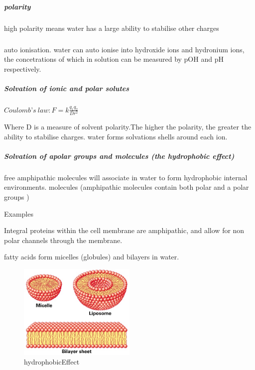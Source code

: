 \documentclass[]{article}
\let\oldsubparagraph\subparagraph
\renewcommand{\subparagraph}[1]{\oldsubparagraph{#1}\mbox{}}
\begin{document}
\hypertarget{polarity}{%
\subparagraph{polarity}\label{polarity}}

high polarity means water has a large ability to stabilise other charges

\hypertarget{section}{%
\subparagraph{}\label{section}}

auto ionisation. water can auto ionise into hydroxide ions and hydronium
ions, the concetrations of which in solution can be measured by pOH and
pH respectively.

\hypertarget{solvation-of-ionic-and-polar-solutes}{%
\subparagraph{Solvation of ionic and polar
solutes}\label{solvation-of-ionic-and-polar-solutes}}

\(Coulomb’s\ law: F = k\frac{ q_{1}q_{2}}{ Dr^{2}}\)

Where D is a measure of solvent polarity.The higher the polarity, the
greater the ability to stabilise charges. water forms solvations shells
around each ion.

\hypertarget{solvation-of-apolar-groups-and-molecules-the-hydrophobic-effect}{%
\subparagraph{Solvation of apolar groups and molecules (the hydrophobic
effect)}\label{solvation-of-apolar-groups-and-molecules-the-hydrophobic-effect}}

free amphipathic molecules will associate in water to form hydrophobic
internal environments. molecules (amphipathic molecules contain both
polar and a polar groups )

Examples

Integral proteins within the cell membrane are amphipathic, and allow
for non polar channels through the membrane.

fatty acids form micelles (globules) and bilayers in water.

\begin{figure}
\centering
\includegraphics[width=0.5\textwidth,height=\textheight]{Images/FattyAcidsInWater.JPG}
\caption{hydrophobicEffect}
\end{figure}
\end{document}
